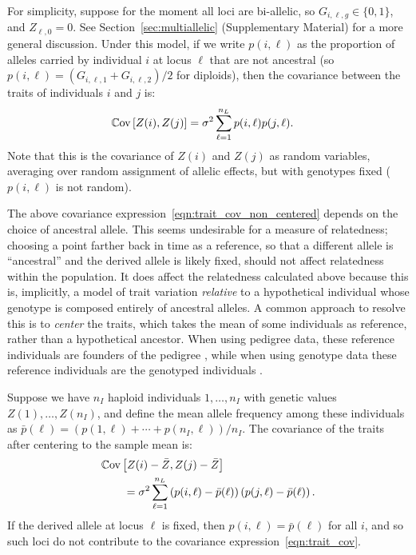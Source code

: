 
For simplicity, suppose for the moment all loci are bi-allelic,
so $G_{i,\ell,g} \in \{0,1\}$, and $Z_{\ell,0} = 0$.
%
See Section~\ref{sec:multiallelic} (Supplementary Material) for a more general discussion.
%
Under this model, if we write $p(i,\ell)$ as the proportion of alleles
carried by individual $i$ at locus $\ell$ that are not ancestral
(so $p(i,\ell) = (G_{i,\ell,1} + G_{i,\ell,2})/2$ for diploids),
then the  %
covariance between the traits of individuals $i$ and $j$ is:
%
\begin{align} \label{eqn:trait_cov_non_centered}
    \mathbb{C}\text{ov}\left[Z(i), Z(j)\right] &= \sigma^2 \sum_{\ell=1}^{n_L} p(i,\ell) p(j,\ell) .
\end{align}
%
Note that this is the covariance of $Z(i)$ and $Z(j)$ as random variables,
averaging over random assignment of allelic effects,
but with genotypes fixed ($p(i,\ell)$ is not random).


The above covariance expression~\eqref{eqn:trait_cov_non_centered}
depends on the choice of ancestral allele.
%
This seems undesirable for a measure of relatedness;
choosing a point farther back in time as a reference,
so that a different allele is ``ancestral'' and the derived allele is likely fixed,
should not affect relatedness within the population.
%
It does affect the relatedness calculated above because this is, implicitly,
a model of trait variation \emph{relative} to a hypothetical individual
whose genotype is composed entirely of ancestral alleles.
%
A common approach to resolve this is to \emph{center} the traits,
which takes the mean of some individuals as reference,
rather than a hypothetical ancestor.
%
When using pedigree data, these reference individuals are
founders of the pedigree \citep{wright1922coefficients},
while when using genotype data these reference individuals are
the genotyped individuals \citep{vanraden2008efficient}.

Suppose we have $n_I$ haploid individuals $1, \dots, n_I$
with genetic values $Z(1), \ldots, Z(n_I)$, %
and define the mean allele frequency among these individuals as
$\bar{p}(\ell) = (p(1,\ell) + \cdots + p(n_I,\ell))/{n_I}$.
%
The covariance of the traits 
after centering to the sample mean is:
%
\begin{align} \label{eqn:trait_cov}
    \begin{split}
        &\mathbb{C}\text{ov}\left[Z(i) - \bar{Z}, Z(j) - \bar{Z}\right] \\
        &\qquad = \sigma^2 \sum_{\ell=1}^{n_L}
            \left(p(i,\ell) - \bar{p}(\ell)\right) \left(p(j,\ell) - \bar{p}(\ell)\right).
    \end{split}
\end{align}
%
If the derived allele at locus $\ell$ is fixed,
then $p(i,\ell) = \bar{p}(\ell)$ for all $i$,
and so such loci do not contribute to the covariance expression~\eqref{eqn:trait_cov}.

